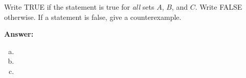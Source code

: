 \documentclass[addpoints,12pt]{exam}
\theoremstyle{remark}
\begin{document}
\begin{questions}
  \newpage
  \question[3] %
  Write TRUE if the statement is true for \emph{all} sets $A$, $B$, and $C$. 
  Write FALSE otherwise.  If a statement is false, give a counterexample.
  
  {\bf Answer:} 
  \begin{enumerate}[(a)]
  \item
  \item
    \vskip4cm
  \item
    \vskip4cm
  \end{enumerate}

\end{questions}

\newpage
\thispagestyle{empty}

{\large \begin{center} \gradetable[v] \end{center}  }
\end{document}
